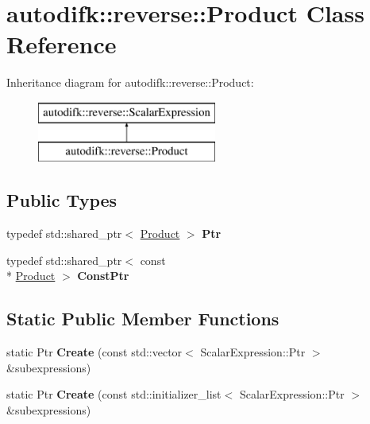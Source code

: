 \hypertarget{classautodifk_1_1reverse_1_1_product}{\section{autodifk\-:\-:reverse\-:\-:Product Class Reference}
\label{classautodifk_1_1reverse_1_1_product}
}
Inheritance diagram for autodifk\-:\-:reverse\-:\-:Product\-:\begin{figure}[H]
\begin{center}
\leavevmode
\includegraphics[height=2.000000cm]{classautodifk_1_1reverse_1_1_product}
\end{center}
\end{figure}
\subsection*{Public Types}
\begin{DoxyCompactItemize}
\item 
\hypertarget{classautodifk_1_1reverse_1_1_product_adeb0428c911321657ce9d7f912506f4b}{typedef std\-::shared\-\_\-ptr$<$ \hyperlink{classautodifk_1_1reverse_1_1_product}{Product} $>$ {\bfseries Ptr}}\label{classautodifk_1_1reverse_1_1_product_adeb0428c911321657ce9d7f912506f4b}

\item 
\hypertarget{classautodifk_1_1reverse_1_1_product_a1be85d66996a10650eec57e55e1cfe5f}{typedef std\-::shared\-\_\-ptr$<$ const \\*
\hyperlink{classautodifk_1_1reverse_1_1_product}{Product} $>$ {\bfseries Const\-Ptr}}\label{classautodifk_1_1reverse_1_1_product_a1be85d66996a10650eec57e55e1cfe5f}

\end{DoxyCompactItemize}
\subsection*{Static Public Member Functions}
\begin{DoxyCompactItemize}
\item 
\hypertarget{classautodifk_1_1reverse_1_1_product_ae7353a17d55204b1678385a65d40b8a5}{static Ptr {\bfseries Create} (const std\-::vector$<$ Scalar\-Expression\-::\-Ptr $>$ \&subexpressions)}\label{classautodifk_1_1reverse_1_1_product_ae7353a17d55204b1678385a65d40b8a5}

\item 
\hypertarget{classautodifk_1_1reverse_1_1_product_a0d75bdfb8798feb61644869c1834d782}{static Ptr {\bfseries Create} (const std\-::initializer\-\_\-list$<$ Scalar\-Expression\-::\-Ptr $>$ \&subexpressions)}\label{classautodifk_1_1reverse_1_1_product_a0d75bdfb8798feb61644869c1834d782}

\end{DoxyCompactItemize}
